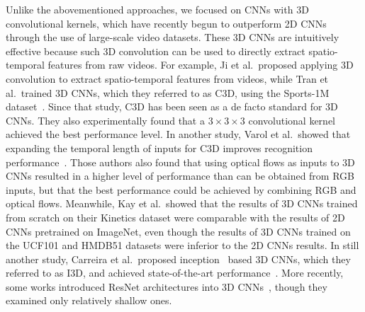 \documentclass[10pt,twocolumn,letterpaper]{article}
\begin{document}
    Unlike the abovementioned approaches,
    we focused on CNNs with 3D convolutional kernels,
    which have recently begun to outperform 2D CNNs through the use of large-scale video datasets.
    These 3D CNNs are intuitively effective
    because such 3D convolution can be used to directly extract spatio-temporal features from raw videos.
    For example, Ji et al.\ proposed applying 3D convolution to extract spatio-temporal features from videos,
    while Tran et al.\ trained 3D CNNs, which they referred to as C3D, using the Sports-1M dataset~\cite{KarpathyCVPR14}.
    Since that study, C3D has been seen as a de facto standard for 3D CNNs.
    They also experimentally found that a \(3 \times 3 \times 3\) convolutional kernel achieved the best performance level.
    In another study, Varol et al.\ showed that expanding the temporal length of inputs for C3D improves recognition performance~\cite{LongTermTemporalConv}.
    Those authors also found that using optical flows as inputs to 3D CNNs resulted in a higher level of performance than can be obtained from RGB inputs,
    but that the best performance could be achieved by combining RGB and optical flows.
    Meanwhile, Kay et al.\ showed that the results of 3D CNNs trained from scratch on their Kinetics dataset were comparable with
    the results of 2D CNNs pretrained on ImageNet,
    even though the results of 3D CNNs trained on the UCF101 and HMDB51 datasets were inferior to the 2D CNNs results.
    In still another study, Carreira et al.\ proposed inception~\cite{Inception} based 3D CNNs, which they referred to as I3D,
    and achieved state-of-the-art performance~\cite{I3D}.
    More recently, some works introduced ResNet architectures into 3D CNNs~\cite{Hara_2017_ICCV_Workshops,res3d},
    though they examined only relatively shallow ones.
\end{document}

